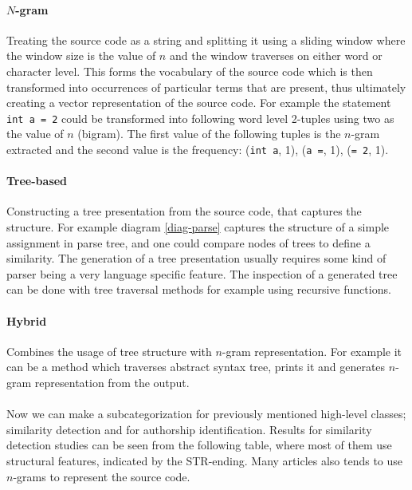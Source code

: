 \paragraph{$N$-gram}
Treating the source code as a string and splitting it using a sliding window where the window size is the value of $n$ and the window traverses on either word or character level. This forms the vocabulary of the source code which is then transformed into occurrences of particular terms that are present, thus ultimately creating a vector representation of the source code. For example the statement \texttt{int a = 2} could be transformed into following word level 2-tuples using two as the value of $n$ (bigram). The first value of the following tuples is the $n$-gram extracted and the second value is the frequency: (\texttt{int a}, 1), (\texttt{a =}, 1), (\texttt{= 2}, 1). 

\paragraph{Tree-based}
Constructing a tree presentation from the source code, that captures the structure. For example diagram \ref{diag-parse} captures the structure of a simple assignment in parse tree, and one could compare \eg nodes of trees to define a similarity. The generation of a tree presentation usually requires some kind of parser being a very language specific feature. The inspection of a generated tree can be done with tree traversal methods for example using recursive functions. 

\paragraph{Hybrid}
Combines the usage of tree structure with $n$-gram representation. For example it can be a method which traverses abstract syntax tree, prints it and generates $n$-gram representation from the output.
\\\\
Now we can make a subcategorization for previously mentioned high-level classes; similarity detection and for authorship identification. Results for similarity detection studies can be seen from the following table, where most of them use structural features, indicated by the STR-ending. Many articles also tends to use $n$-grams to represent the source code.


